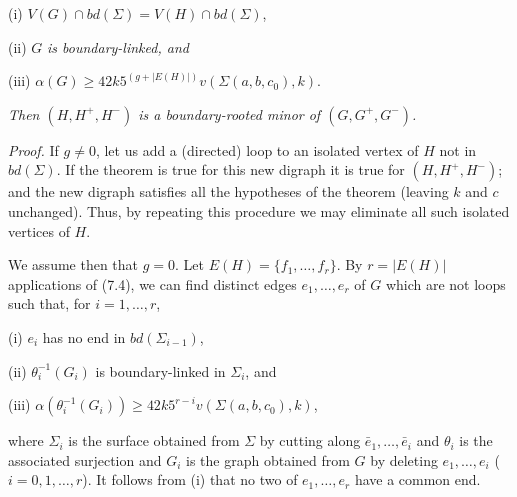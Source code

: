 \hspace*{12pt}(i) $V(G) \cap bd(\Sigma) = V(H) \cap bd(\Sigma)$,

\hspace*{12pt}(ii) $G$ \textit{is boundary-linked, and}

\hspace*{12pt}(iii) $\alpha(G) \ge 42k 5^{(g+|E(H)|)} v(\Sigma(a, b, c_0), k)$.

\textit{Then $(H, H^+, H^-)$ is a boundary-rooted minor of $(G, G^+, G^-)$.}

\textit{Proof.} If $g \ne 0$, let us add a (directed) loop to an isolated vertex of $H$ not in $bd(\Sigma)$. If the theorem is true for this new digraph it is true for $(H, H^+, H^-)$; and the new digraph satisfies all the hypotheses of the theorem (leaving $k$ and $c$ unchanged). Thus, by repeating this procedure we may eliminate all such isolated vertices of $H$.

We assume then that $g = 0$. Let $E(H) = \{f_1, \dots, f_r\}$. By $r = |E(H)|$ applications of (7.4), we can find distinct edges $e_1, \dots, e_r$ of $G$ which are not loops such that, for $i = 1, \dots, r$,

\hspace*{12pt}(i) $e_i$ has no end in $bd(\Sigma_{i-1})$,

\hspace*{12pt}(ii) $\theta_i^{-1}(G_i)$ is boundary-linked in $\Sigma_i$, and

\hspace*{12pt}(iii) $\alpha(\theta_i^{-1}(G_i)) \ge 42k 5^{r-i} v(\Sigma(a, b, c_0), k)$,

where $\Sigma_i$ is the surface obtained from $\Sigma$ by cutting along $\bar{e}_1, \dots, \bar{e}_i$ and $\theta_i$ is the associated surjection and $G_i$ is the graph obtained from $G$ by deleting $e_1, \dots, e_i$ ($i = 0, 1, \dots, r$). It follows from (i) that no two of $e_1, \dots, e_r$ have a common end.

